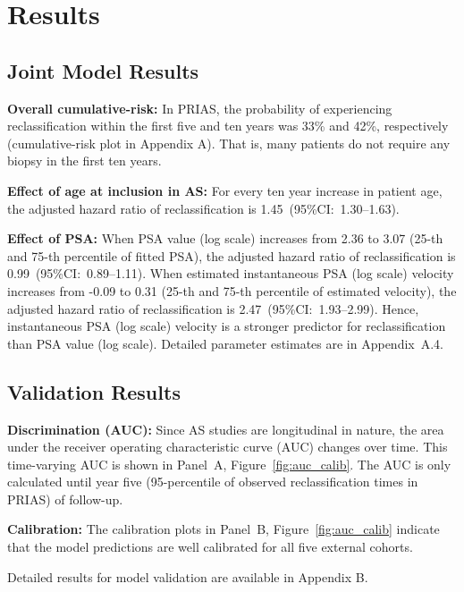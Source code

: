 \section{Results}
\subsection{Joint Model Results}
\textbf{Overall cumulative-risk:} In PRIAS, the probability of experiencing reclassification within the first five and ten years was 33\% and 42\%, respectively (cumulative-risk plot in Appendix A). That is, many patients do not require any biopsy in the first ten years.

\textbf{Effect of age at inclusion in AS:} For every ten year increase in patient age, the adjusted hazard ratio of reclassification is 1.45~(95\%CI:~1.30--1.63). 

\textbf{Effect of PSA:} When PSA value (log scale) increases from 2.36 to 3.07 (25-th and 75-th percentile of fitted PSA), the adjusted hazard ratio of reclassification is 0.99~(95\%CI:~0.89--1.11). When estimated instantaneous PSA (log scale) velocity increases from -0.09 to 0.31 (25-th and 75-th percentile of estimated velocity), the adjusted hazard ratio of reclassification is 2.47~(95\%CI:~1.93--2.99). Hence, instantaneous PSA (log scale) velocity is a stronger predictor for reclassification than PSA value (log scale). Detailed parameter estimates are in Appendix~A.4.

\subsection{Validation Results}
\textbf{Discrimination (AUC):} Since AS studies are longitudinal in nature, the area under the receiver operating characteristic curve (AUC) changes over time. This time-varying AUC is shown in Panel~A, Figure~\ref{fig:auc_calib}. The AUC is only calculated until year five (95-percentile of observed reclassification times in PRIAS) of follow-up. 

\textbf{Calibration:} The calibration plots in Panel~B, Figure~\ref{fig:auc_calib} indicate that the model predictions are well calibrated for all five external cohorts. 

Detailed results for model validation are available in Appendix B.

